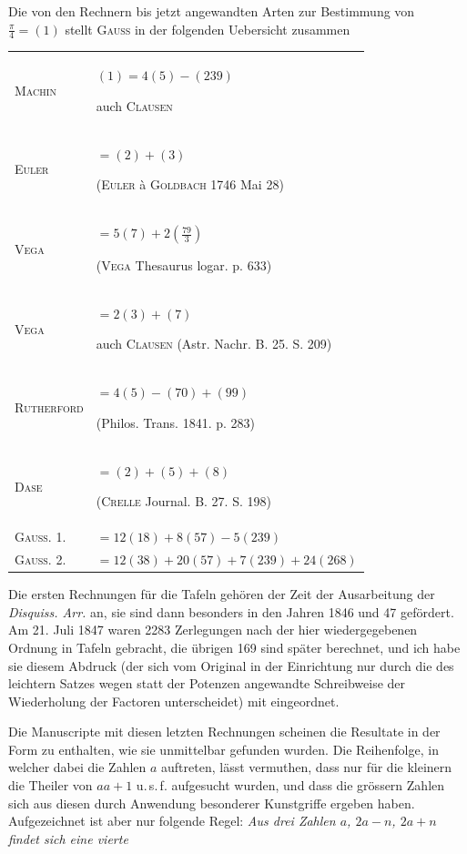 \par Die von den Rechnern bis jetzt angewandten Arten zur Bestimmung von $\frac{\pi}{4}=(1)$ stellt \textsc{Gauss} in der folgenden Uebersicht zusammen
\begingroup\fontsize{10}{13}\selectfont\setlength{\tabcolsep}{3pt}
\begin{longtable}{@{}l p{.74\linewidth}@{}}
\textsc{Machin} & $(1)=4(5)-(239)$\par auch \textsc{Clausen} \\[3pt]
\textsc{Euler} & ${}=(2)+(3)$\par (\textsc{Euler} à \textsc{Goldbach} 1746 Mai 28) \\[3pt]
\textsc{Vega} & ${}=5(7)+2(\frac{79}{3})$\par (\textsc{Vega} Thesaurus logar. p. 633) \\[3pt]
\textsc{Vega} & ${}=2(3)+(7)$\par auch \textsc{Clausen} (Astr. Nachr. B. 25. S. 209) \\[3pt]
\textsc{Rutherford} & ${}=4(5)-(70)+(99)$\par (Philos. Trans. 1841. p. 283) \\[3pt]
\textsc{Dase} & ${}=(2)+(5)+(8)$\par (\textsc{Crelle} Journal. B. 27. S. 198) \\[3pt]
\textsc{Gauss}. 1. & ${}=12(18)+8(57)-5(239)$ \\[3pt]
\textsc{Gauss}. 2. & ${}=12(38)+20(57)+7(239)+24(268)$ \\[3pt]
\end{longtable}\endgroup
\par Die ersten Rechnungen für die Tafeln gehören der Zeit der Ausarbeitung der \textit{Disquiss. Arr.} an, sie sind dann besonders in den Jahren 1846 und 47 gefördert. Am 21. Juli 1847 waren 2283 Zerlegungen nach der hier wiedergegebenen Ordnung in Tafeln gebracht, die übrigen 169 sind später berechnet, und ich habe sie diesem Abdruck (der sich vom Original in der Einrichtung nur durch die des leichtern Satzes wegen statt der Potenzen angewandte Schreibweise der Wiederholung der Factoren unterscheidet) mit eingeordnet.
\par Die Manuscripte mit diesen letzten Rechnungen scheinen die Resultate in der Form zu enthalten, wie sie unmittelbar gefunden wurden. Die Reihenfolge, in welcher dabei die Zahlen $a$ auftreten, lässt vermuthen, dass nur für die kleinern die Theiler von $aa+1$ u.\,s.\,f. aufgesucht wurden, und dass die grössern Zahlen sich aus diesen durch Anwendung besonderer Kunstgriffe ergeben haben. Aufgezeichnet ist aber nur folgende Regel: \textit{Aus drei Zahlen $a$, $2a-n$, $2a+n$ findet sich eine vierte}
